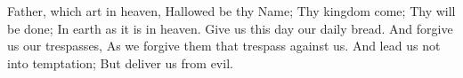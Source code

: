  Father, which art in heaven, Hallowed be thy Name; Thy kingdom come; Thy will be done; In earth as it is in heaven. Give us this day our daily bread. And forgive us our trespasses, As we forgive them that trespass against us. And lead us not into temptation; But deliver us from evil.
